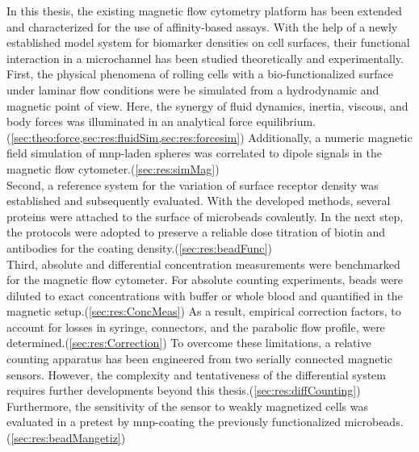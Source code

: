 In this thesis, the existing magnetic flow cytometry platform has been extended and characterized for the use of affinity-based assays. With the help of a newly established model system for biomarker densities on cell surfaces, their functional interaction in a microchannel has been studied theoretically and experimentally.\\
First, the physical phenomena of rolling cells with a bio-functionalized surface under laminar flow conditions were be simulated from a hydrodynamic and magnetic point of view. Here, the synergy of fluid dynamics, inertia, viscous, and body forces was illuminated in an analytical force equilibrium.(\cref{sec:theo:force,sec:res:fluidSim,sec:res:forcesim}) Additionally, a numeric magnetic field simulation of \gls{mnp}-laden spheres was correlated to dipole signals in the magnetic flow cytometer.(\cref{sec:res:simMag})\\
Second, a reference system for the variation of surface receptor density was established and subsequently evaluated. With the developed methods, several proteins were attached to the surface of microbeads covalently. In the next step, the protocols were adopted to preserve a reliable dose titration of biotin and antibodies for the coating density.(\cref{sec:res:beadFunc}) \\
Third, absolute and differential concentration measurements were benchmarked for the magnetic flow cytometer. For absolute counting experiments, beads were diluted to exact concentrations with buffer or whole blood and quantified in the magnetic setup.(\cref{sec:res:ConcMeas}) As a result, empirical correction factors, to account for losses in syringe, connectors, and the parabolic flow profile, were determined.(\cref{sec:res:Correction}) To overcome these limitations, a relative counting apparatus has been engineered from two serially connected magnetic sensors. However, the complexity and tentativeness of the differential system requires further developments beyond this thesis.(\cref{sec:res:diffCounting}) Furthermore, the sensitivity of the sensor to weakly magnetized cells was evaluated in a pretest by \gls{mnp}-coating the previously functionalized microbeads.(\cref{sec:res:beadMangetiz}) \\
